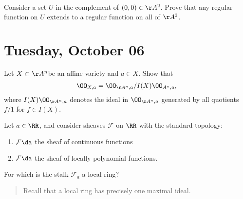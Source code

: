 \begin{exercise}[Problem 5]

Consider a set \(U\) in the complement of \((0, 0) \in \AA^2\). Prove
that any regular function on \(U\) extends to a regular function on all
of \(\AA^2\).

\end{exercise}

\hypertarget{tuesday-october-06}{%
\section{Tuesday, October 06}\label{tuesday-october-06}}

\begin{problem}[Gathmann 3.20]

Let \(X\subset \AA^n\)be an affine variety and \(a\in X\). Show that
\begin{align*}  
\OO_{X, a} = \OO_{\AA^n, a} / I(X) \OO_{A^n,a}
,\end{align*} where \(I(X) \OO_{\AA^n, a}\) denotes the ideal in
\(\OO_{\AA^n, a}\) generated by all quotients \(f/1\) for \(f\in I(X)\).

\end{problem}

\begin{problem}[Gathmann 3.21]

Let \(a\in \RR\), and consider sheaves \(\mathcal{F}\) on \(\RR\) with
the standard topology:

\begin{enumerate}
\def\labelenumi{\arabic{enumi}.}
\tightlist
\item
  \(\mathcal{F} \da\) the sheaf of continuous functions
\item
  \(\mathcal{F} \da\) the sheaf of locally polynomial functions.
\end{enumerate}

For which is the stalk \(\mathcal{F}_a\) a local ring?

\begin{quote}
Recall that a local ring has precisely one maximal ideal.
\end{quote}

\end{problem}

